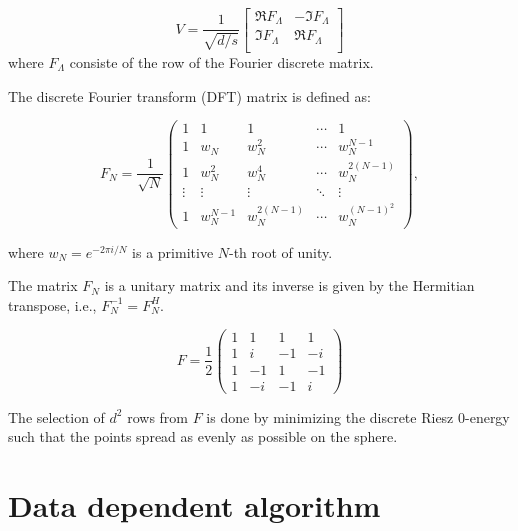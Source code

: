 \begin{frame}
  \frametitle{}

  \begin{equation*}
    V =
    \frac{1}{\sqrt{d/s}}
    \begin{bmatrix}
      \Re F_\Lambda &  - \Im F_\Lambda \\
      \Im F_\Lambda & \Re F_\Lambda \\
    \end{bmatrix}
  \end{equation*}
  where  $F_\Lambda$  consiste of the row of the Fourier discrete matrix. 

  The discrete Fourier transform (DFT) matrix is defined as:

  $$
  F_{N}=\frac{1}{\sqrt{N}}\begin{pmatrix}
  1 & 1 & 1 & \cdots & 1 \\
  1 & w_{N} & w_{N}^{2} & \cdots & w_{N}^{N-1} \\
  1 & w_{N}^{2} & w_{N}^{4} & \cdots & w_{N}^{2(N-1)} \\
  \vdots & \vdots & \vdots & \ddots & \vdots \\
  1 & w_{N}^{N-1} & w_{N}^{2(N-1)} & \cdots & w_{N}^{(N-1)^{2}}
  \end{pmatrix},
  $$
  

  where $w_N = e^{-2\pi i/N}$ is a primitive $N$-th root of unity. 
  
\end{frame}

\begin{frame}
  The matrix $F_N$ is a unitary matrix and its inverse is given by the Hermitian transpose, i.e., $F_N^{-1} = F_N^H$.


$$ F = \frac{1}{2}
\begin{pmatrix}
1 & 1 & 1 & 1 \\
1 & i & -1 & -i \\
1 & -1 & 1 & -1 \\
1 & -i & -1 & i
\end{pmatrix}
$$

The selection of $d^2$ rows from $F$ is done by minimizing the discrete Riesz 0-energy such that the points spread as evenly as possible on the sphere.

\end{frame}

\section{Data dependent algorithm}

